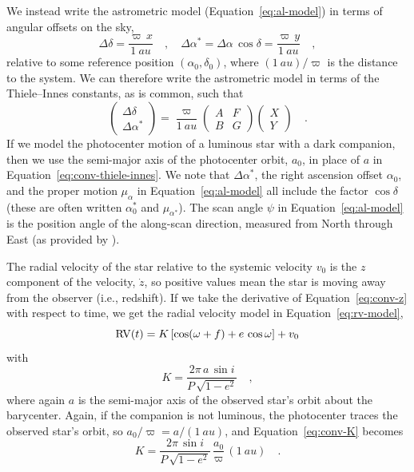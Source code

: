\documentclass[twocolumn]{AASTeX7/aastex701}
\begin{document}
We instead write the astrometric model (Equation~\ref{eq:al-model}) in terms of
angular offsets on the sky,
\begin{equation}
  \Delta\delta = \frac{\varpi\,x}{1~\unit{au}}
  \quad , \quad
  \Delta\alpha^* = \Delta\alpha\,\cos\delta = \frac{\varpi\,y}{1~\unit{au}}
  \quad ,
\end{equation}
relative to some reference position $(\alpha_0, \delta_0)$, where $(1~\unit{au}) /
\varpi$ is the distance to the system.
We can therefore write the astrometric model in terms of the Thiele--Innes constants, as
is common, such that
\begin{equation}
  \begin{pmatrix} \Delta\delta \\ \Delta\alpha^* \end{pmatrix} =
  \frac{\varpi}{1~\unit{au}}
  \begin{pmatrix} A & F \\ B & G \end{pmatrix}
  \begin{pmatrix} X \\ Y \end{pmatrix}
  \quad .
  \label{eq:conv-sky-angular}
\end{equation}
If we model the photocenter motion of a luminous star with a dark companion, then we
use the semi-major axis of the photocenter orbit, $a_0$, in place of $a$ in
Equation~\ref{eq:conv-thiele-innes}.
We note that $\Delta\alpha^*$, the right ascension offset $\alpha_0$, and the proper
motion $\mu_\alpha$ in Equation~\ref{eq:al-model} all include the factor $\cos\delta$
(these are often written $\alpha^*_0$ and $\mu_{\alpha^*}$).
The scan angle $\psi$ in Equation~\ref{eq:al-model} is the position angle of the
along-scan direction, measured from North through East (as provided by \gaia).

The radial velocity of the star relative to the systemic velocity $v_0$ is the $z$
component of the velocity, $\dot{z}$, so positive values mean the star is moving away
from the observer (i.e., redshift).
If we take the derivative of Equation~\ref{eq:conv-z} with respect to time, we get the
radial velocity model in Equation~\ref{eq:rv-model},
\begin{equation}
  {\rm RV}(t) = K\,[\cos(\omega + f) + e\,\cos\omega] + v_0
\end{equation}
with
\begin{equation}
  K = \frac{2\pi\,a\,\sin i}{P\,\sqrt{1 - e^2}}
  \quad ,
  \label{eq:conv-K}
\end{equation}
where again $a$ is the semi-major axis of the observed star's orbit about the
barycenter.
Again, if the companion is not luminous, the photocenter traces the observed star's
orbit, so $a_0 / \varpi = a / (1~\unit{au})$, and Equation~\ref{eq:conv-K} becomes
\begin{equation}
  K = \frac{2\pi\,\sin i}{P\,\sqrt{1 - e^2}} \, \frac{a_0}{\varpi} \, (1~\unit{au})
  \quad .
  \label{eq:conv-tie}
\end{equation}
\end{document}
